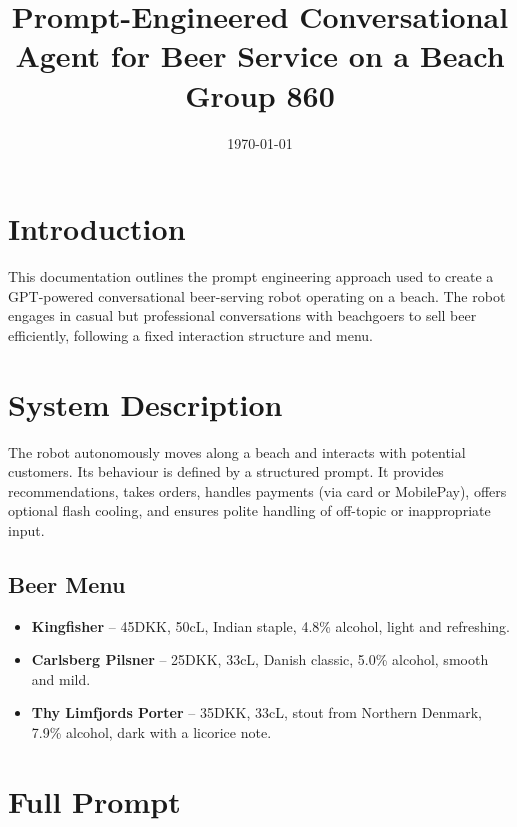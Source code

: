 \documentclass[11pt,a4paper]{article}
\title{Prompt-Engineered Conversational Agent for Beer Service on a Beach\\\large Group 860}
\date{\today}
\author{}
\begin{document}
\maketitle

\section{Introduction}
This documentation outlines the prompt engineering approach used to create a GPT-powered conversational beer-serving robot operating on a beach. The robot engages in casual but professional conversations with beachgoers to sell beer efficiently, following a fixed interaction structure and menu.

\section{System Description}
The robot autonomously moves along a beach and interacts with potential customers. Its behaviour is defined by a structured prompt. It provides recommendations, takes orders, handles payments (via card or MobilePay), offers optional flash cooling, and ensures polite handling of off-topic or inappropriate input.

\subsection*{Beer Menu}
\begin{itemize}[noitemsep]
  \item \textbf{Kingfisher} -- 45DKK, 50cL, Indian staple, 4.8\% alcohol, light and refreshing.
  \item \textbf{Carlsberg Pilsner} -- 25DKK, 33cL, Danish classic, 5.0\% alcohol, smooth and mild.
  \item \textbf{Thy Limfjords Porter} -- 35DKK, 33cL, stout from Northern Denmark, 7.9\% alcohol, dark with a licorice note.
\end{itemize}

\section{Full Prompt}
\end{document}
